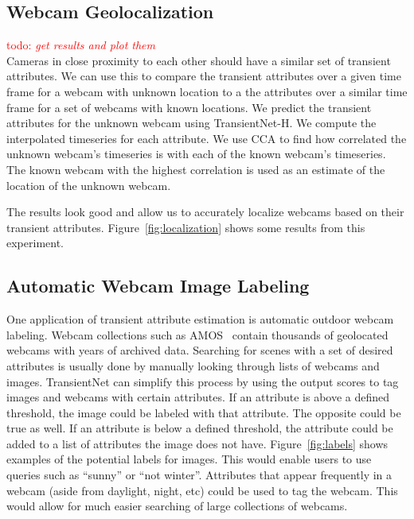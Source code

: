 \documentclass[10pt,twocolumn,letterpaper]{article}
\newcommand{\todo}[1]{\textcolor{red}{todo: {\em #1}}}
\newcommand{\figref}[1]{Figure~\ref{fig:#1}}
\begin{document}
\subsection{Webcam Geolocalization}
\todo{get results and plot them} \\
\indent
Cameras in close proximity to each other should have a similar set of transient
attributes.  We can use this to compare the transient attributes over a given
time frame for a webcam with unknown location to a the attributes over a
similar time frame for a set of webcams with known locations.  We predict the
transient attributes for the unknown webcam using TransientNet-H.  We compute
the interpolated timeseries for each attribute.  We use CCA to find how
correlated the unknown webcam's timeseries is with each of the known webcam's
timeseries.  The known webcam with the highest correlation is used as an
estimate of the location of the unknown webcam.
 
The results look good and allow us to accurately localize webcams based on their
transient attributes.  \figref{localization} shows some results from this 
experiment.

\subsection{Automatic Webcam Image Labeling}
\indent
One application of transient attribute estimation is automatic outdoor webcam
labeling. Webcam collections such as AMOS~\cite{jacobs07amos} contain thousands
of geolocated webcams with years of archived data.  Searching for scenes with a
set of desired attributes is usually done by manually looking through lists of
webcams and images.  TransientNet can simplify this process by using the output
scores to tag images and webcams with certain attributes.  If an attribute is
above a defined threshold, the image could be labeled with that attribute.  The
opposite could be true as well.  If an attribute is below a defined threshold,
the attribute could be added to a list of attributes the image does not have.
\figref{labels} shows examples of the potential labels for images. This would
enable users to use queries such as ``sunny'' or ``not winter''.  Attributes
that appear frequently in a webcam (aside from daylight, night, etc) could be
used to tag the webcam.  This would allow for much easier searching of large
collections of webcams.
\end{document}
